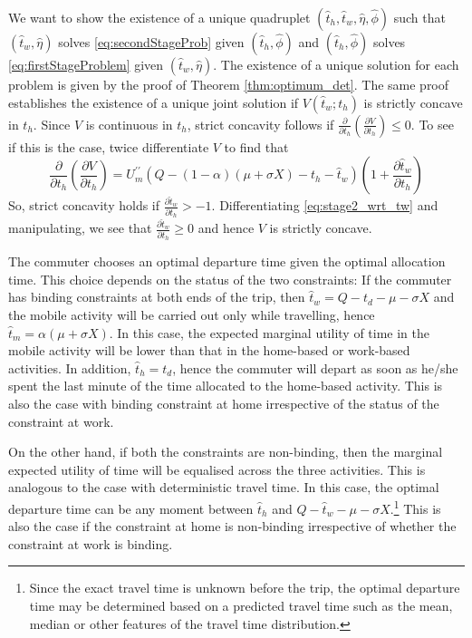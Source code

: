 \documentclass[12pt,a4paper,british]{article}
\makeatletter
\newenvironment{proof}[1][\proofname]{\par
    \normalfont\topsep6\p@\@plus6\p@\relax
    \trivlist
    \itemindent\parindent
    \item[\hskip\labelsep
          \scshape
      #1]\ignorespaces
  }{%
    \endtrivlist\@endpefalse
  }
\providecommand{\proofname}{Proof}
\makeatother
\begin{document}
\begin{proof}
We want to show the existence of a unique quadruplet $\left( \hat{t}_{h},\hat{t}_{w}, \hat{\eta},\hat{\phi}\right)$ such that $\left( \hat{t}_{w}, \hat{\eta}\right)$ solves \eqref{eq:secondStageProb} given $\left( \hat{t}_{h},\hat{\phi}\right)$ and $\left( \hat{t}_{h},\hat{\phi}\right)$ solves \eqref{eq:firstStageProblem} given $\left( \hat{t}_{w},\hat{\eta}\right)$. The existence of a unique solution for each problem is given by the proof of Theorem \ref{thm:optimum_det}. The same proof establishes the existence of a unique joint solution if $V\left(\hat{t}_{w};t_{h}\right)$ is strictly concave in $t_{h}$. Since $V$ is continuous in $t_{h}$, strict concavity follows if $\frac{\partial}{\partial t_{h}}\left(\frac{\partial V}{\partial t_{h}}\right) \leq 0$. To see if this is the case, twice differentiate $V$ to find that%
\begin{equation*}
\frac{\partial}{\partial t_{h}}\left(\frac{\partial V}{\partial t_{h}}\right) = U_{m}^{\prime\prime} \left(Q - \left(1 - \alpha\right) \left(\mu + \sigma X\right) - t_{h} - \hat{t}_{w} \right) \left( 1 + \frac{\partial\hat{t}_{w}}{\partial t_{h}}\right)
\end{equation*}
So, strict concavity holds if $\frac{\partial\hat{t}_{w}}{\partial t_{h}} > -1$. Differentiating \eqref{eq:stage2_wrt_tw} and manipulating, we see that  $\frac{\partial\hat{t}_{w}} {\partial t_{h}} \geq 0$ and hence $V$ is strictly concave.
\end{proof}


The commuter chooses an optimal departure time given the optimal allocation time. This choice depends on the status of the two constraints: If the commuter has binding constraints at both ends of the trip, then $\hat{t}_{w}=Q-t_{d}-\mu-\sigma X$ and the mobile activity will be carried out only while travelling, hence $\hat{t}_{m}=\alpha\left(\mu+\sigma X\right)$. In this case, the expected marginal utility of time in the mobile activity will be lower than that in the home-based or work-based activities. In addition, $\hat{t}_{h}=t_{d}$, hence the commuter will depart as soon as he/she spent the last minute of the time allocated to the home-based activity. This is also the case with binding constraint at home irrespective of the status of the constraint at work.

On the other hand, if both the constraints are non-binding, then the marginal expected utility of time will be equalised across the three activities. This is analogous to the case with deterministic travel time. In this case, the optimal departure time can be any moment between $\hat{t}_{h}$ and $Q-\hat{t}_{w}-\mu-\sigma X$.\footnote{Since the exact travel time is unknown before the trip, the optimal departure time may be determined based on a predicted travel time such as the mean, median or other features of the travel time distribution.} This is also the case if the constraint at home is non-binding irrespective of whether the constraint at work is binding. 
\end{document}
